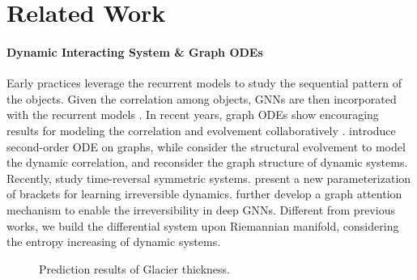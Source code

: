 \section{Related Work}
\paragraph{Dynamic Interacting System \& Graph ODEs}
Early practices leverage the recurrent models  to study the sequential pattern of the objects.
Given the correlation among objects, GNNs \cite{nips23ssLRD,www24GAUSS} are then incorporated with the recurrent models \cite{nips19rstgnn,nips19HVGRNN,aaai22Fan}.
In recent years, graph ODEs show encouraging results for modeling the correlation and evolvement collaboratively \cite{kdd21CoupledGraphODE,wsdm23Luo}.
\citet{icml23HOPE,kdd22zhang,PMLR20Xhonneux} introduce second-order ODE on graphs,
 while  \citet{kdd21CoupledGraphODE,wsdm23Luo} consider the structural evolvement to model the dynamic correlation, and
\citet{aaai24ChenWLLsigned} reconsider the graph structure of dynamic systems.
Recently, \citet{nips23tango} study  time-reversal symmetric systems. \citet{nips21Lee} present a new parameterization of brackets for learning irreversible dynamics. \citet{nips23Lee} further develop a  graph attention mechanism  to enable the irreversibility in deep GNNs.
Different from previous works, we build the differential system upon Riemannian manifold, considering the entropy increasing of dynamic systems.


\begin{figure} 
\centering 
{}
\vspace{-0.1in}
 \caption{Prediction results of Glacier thickness.}
\label{Fig-glacier}
\end{figure}


